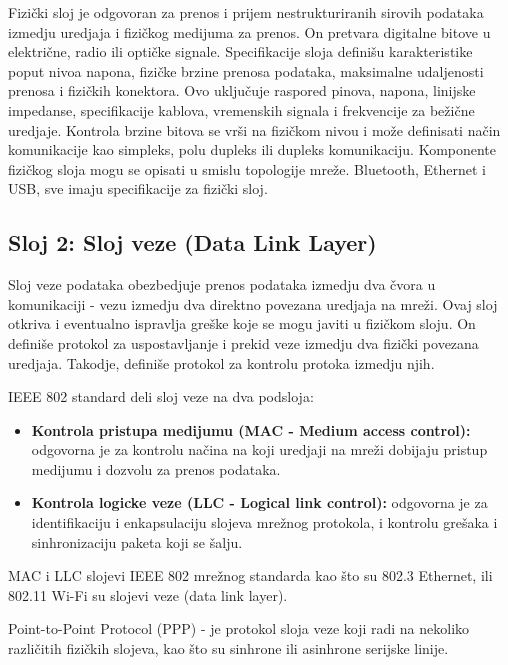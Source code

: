 \documentclass[a4paper,12pt, master]{etf}
\begin{document}
	Fizi\v{c}ki sloj je odgovoran za prenos i prijem nestrukturiranih sirovih
	podataka izmedju uredjaja i fizi\v{c}kog medijuma za prenos. On pretvara
	digitalne bitove u elektri\v{c}ne, radio ili opti\v{c}ke signale.
	Specifikacije sloja defini\v{s}u karakteristike poput nivoa napona,
	fizi\v{c}ke brzine prenosa podataka, maksimalne udaljenosti prenosa i
	fizi\v{c}kih konektora. Ovo	uklju\v{c}uje raspored pinova, napona, linijske
	impedanse, specifikacije kablova, vremenskih signala i frekvencije za
	be\v{z}i\v{c}ne uredjaje. Kontrola brzine bitova se vr\v{s}i na fizi\v{c}kom
	nivou i mo\v{z}e definisati na\v{c}in komunikacije kao simpleks, polu
	dupleks ili dupleks	komunikaciju. Komponente fizi\v{c}kog sloja mogu se
	opisati u smislu topologije mre\v{z}e. Bluetooth, Ethernet i USB, sve imaju
	specifikacije za fizi\v{c}ki sloj.

	\subsection{Sloj 2: Sloj veze (Data Link Layer)}

	Sloj veze podataka obezbedjuje prenos podataka izmedju dva \v{c}vora u
	komunikaciji - vezu	izmedju dva direktno povezana uredjaja na mre\v{z}i.
	Ovaj sloj otkriva i eventualno ispravlja gre\v{s}ke koje se mogu javiti u
	fizi\v{c}kom sloju. On defini\v{s}e protokol za uspostavljanje i prekid
	veze izmedju dva fizi\v{c}ki povezana uredjaja. Takodje, defini\v{s}e
	protokol za kontrolu protoka izmedju njih.

	IEEE 802 standard deli sloj veze na dva podsloja:
	\begin{itemize}
		\item \textbf{Kontrola pristupa medijumu (MAC - Medium access control):}
		odgovorna je za kontrolu na\v{c}ina na koji uredjaji na mre\v{z}i
		dobijaju pristup medijumu i	dozvolu za prenos podataka.
		\item \textbf{Kontrola logicke veze (LLC - Logical link control):}
		odgovorna je za identifikaciju i enkapsulaciju slojeva mre\v{z}nog
		protokola, i kontrolu gre\v{s}aka i sinhronizaciju paketa koji se
		\v{s}alju.
	\end{itemize}

	MAC i LLC slojevi IEEE 802 mre\v{z}nog standarda kao \v{s}to su 802.3
	Ethernet, ili 802.11 Wi-Fi su slojevi veze (data link layer).

	Point-to-Point Protocol (PPP) - je protokol sloja veze koji radi na
	nekoliko razli\v{c}itih	fizi\v{c}kih slojeva, kao \v{s}to su sinhrone ili
	asinhrone serijske linije.
\end{document}
